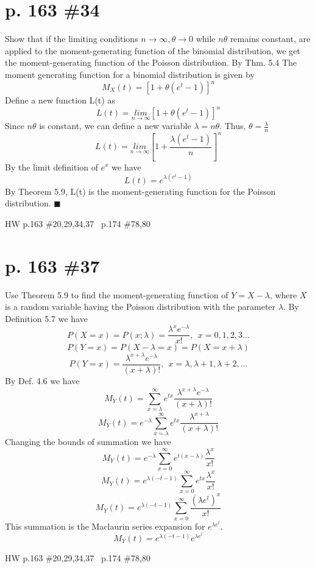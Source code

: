\documentclass[12pt]{article}
\begin{document}
	\section[20pt]{p. 163 \#34}
	Show that if the limiting conditions \(n\to\infty,\theta\to 0\) while \(n\theta\) remains constant, are applied to the moment-generating function of the binomial distribution, we get the moment-generating function of the Poisson distribution.
	\newline\newline
	By Thm. 5.4 The moment generating function for a binomial distribution is given by
	\[M_X(t)=[1+\theta(e^t-1)]^n\]
	Define a new function L(t) as
	\[L(t)=\underset{n\to\infty}{lim}[1+\theta(e^t-1)]^n\]
	Since \(n\theta\) is constant, we can define a new variable \(\lambda = n\theta\). Thus, \(\theta=\frac{\lambda}{n}\)
	\[L(t)=\underset{n\to\infty}{lim}\left[1+\frac{\lambda(e^t-1)}{n}\right]^n\]
	By the limit definition of \(e^x\) we have
	\[L(t)=e^{\lambda(e^t-1)}\]
	By Theorem 5.9, L(t) is the moment-generating function for the Poisson distribution. \newline
	\(\blacksquare\)
	\newpage
	\maketitle HW p.163 \#20,29,34,37 \ p.174 \#78,80
	\section[20pt]{p. 163 \#37}
	Use Theorem 5.9 to find the moment-generating function of \(Y=X-\lambda\), where \(X\) is a random variable having the Poisson distribution with the parameter \(\lambda\).
	\newline
	\newline
	By Definition 5.7 we have
	\[P(X=x)=P(x;\lambda)=\frac{\lambda^xe^{-\lambda}}{x!}, \ \ x = 0,1,2,3...\]
	\[P(Y=x)=P(X-\lambda=x)=P(X=x+\lambda)\]
	\[P(Y=x)=\frac{\lambda^{x+\lambda}e^{-\lambda}}{(x+\lambda)!},\ \  x = \lambda, \lambda+1,\lambda+2,...\]
	By Def. 4.6 we have
	\[M_Y(t)=\sum_{x=\lambda}^{\infty}e^{tx}\frac{\lambda^{x+\lambda}e^{-\lambda}}{(x+\lambda)!}\]
	\[M_Y(t)=e^{-\lambda}\sum_{x=\lambda}^{\infty}e^{tx}\frac{\lambda^{x+\lambda}}{(x+\lambda)!}\]
	Changing the bounds of summation we have
	\[M_Y(t)=e^{-\lambda}\sum_{x=0}^{\infty}e^{t(x-\lambda)}\frac{\lambda^{x}}{x!}\]
	\[M_Y(t)=e^{\lambda(-t-1)}\sum_{x=0}^{\infty}e^{tx}\frac{\lambda^{x}}{x!}\]
	\[M_Y(t)=e^{\lambda(-t-1)}\sum_{x=0}^{\infty}\frac{(\lambda e^t)^{x}}{x!}\]
	This summation is the Maclaurin series expansion for \(e^{\lambda e^t}\).
	\[M_Y(t)=e^{\lambda(-t-1)}e^{\lambda e^t}\]
	\newpage
	\maketitle HW p.163 \#20,29,34,37 \ p.174 \#78,80
\end{document}
